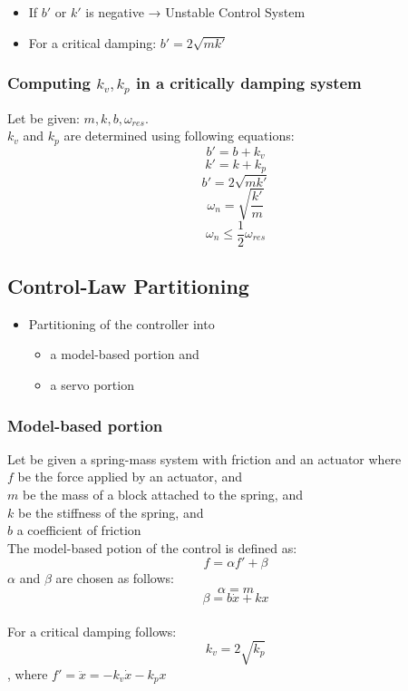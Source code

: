 \documentclass[10pt,a4paper]{article}
\begin{document}
\begin{itemize}
	\item If $b'$ or $k'$ is negative → Unstable Control System
	\item For a critical damping: $b' = 2\sqrt{mk'}$
\end{itemize}

\subsubsection{Computing $k_v, k_p$ in a critically damping system}
Let be given: $m, k, b, \omega_{res}$. \\
$k_v$ and $k_p$ are determined using following equations:
$$
b' = b + k_v
$$
$$
k' = k + k_p
$$
$$
b' = 2\sqrt{mk'}
$$
$$
\omega_n = \sqrt{\frac{k'}{m}}
$$
$$
\omega_n ≤ \frac 1 2 \omega_{res}
$$

\subsection{Control-Law Partitioning}
\begin{itemize}
	\item Partitioning of the controller into
	\begin{itemize}
		\item a model-based portion and
		\item a servo portion
	\end{itemize}
\end{itemize}

\subsubsection{Model-based portion}
Let be given a spring-mass system with friction and an actuator where \\
$f$ be the force applied by an actuator, and \\
$m$ be the mass of a block attached to the spring, and \\
$k$ be the stiffness of the spring, and \\
$b$ a coefficient of friction \\
The model-based potion of the control is defined as:
$$
f = \alpha f' + \beta
$$
$\alpha$ and $\beta$ are chosen as follows:
$$
\alpha = m
$$
$$
\beta = b \dot x + k x
$$
\\

For a critical damping follows: 
$$	
k_v = 2\sqrt{k_p}
$$
, where $f' = \ddot x = -k_v \dot x - k_p x$
\end{document}
